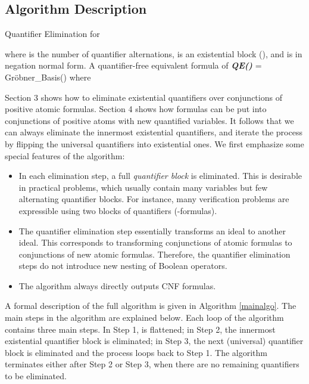 \documentclass[envcountsect]{llncs}
\begin{document}
\subsection{Algorithm Description}
\begin{algorithm}[h]
\caption{Quantifier Elimination for }
\label{mainalgo}
    \begin{algorithmic}[1]
  where  is the number of quantifier alternations,  is an existential block (), and  is in negation normal form.
 A quantifier-free equivalent formula of 
 {\bf\em QE()}
\WHILE{}
\STATE 
\STATE  = Gr\"obner\_Basis()
\IF{}
\STATE 
{}
\ENDIF
\STATE  where 
\STATE  
{}
\ENDFOR
\STATE 
\STATE 
\ENDWHILE
\RETURN 
    \end{algorithmic}
\end{algorithm}


Section 3 shows how to eliminate existential quantifiers over conjunctions of positive atomic formulas. Section 4 shows how formulas can be put into conjunctions of positive atoms with new quantified variables. It follows that we can always eliminate the innermost existential quantifiers, and iterate the process by flipping the universal quantifiers into existential ones. We first emphasize some special features of the algorithm:
\begin{itemize}
\item In each elimination step, a full {\em quantifier block} is eliminated. This is desirable in practical problems, which usually contain many variables but few alternating quantifier blocks. For instance, many verification problems are expressible using two blocks of quantifiers (-formulas). 
\item The quantifier elimination step essentially transforms an ideal to another ideal. This corresponds to transforming conjunctions of atomic formulas to conjunctions of new atomic formulas. Therefore, the quantifier elimination steps do not introduce new nesting of Boolean operators.
\item The algorithm always directly outputs CNF formulas.
\end{itemize}

A formal description of the full algorithm is given in Algorithm \ref{mainalgo}. The main steps in the algorithm are explained below. Each loop of the algorithm contains three main steps. In Step 1,  is flattened; in Step 2, the innermost existential quantifier block is eliminated; in Step 3, the next (universal) quantifier block is eliminated and the process loops back to Step 1. The algorithm terminates either after Step 2 or Step 3, when there are no remaining quantifiers to be eliminated.
\end{document}
